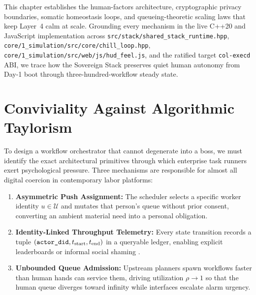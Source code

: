 This chapter establishes the human-factors architecture, cryptographic privacy boundaries, somatic homeostasis loops, and queueing-theoretic scaling laws that keep Layer~4 calm at scale. Grounding every mechanism in the live C++20 and JavaScript implementation across \texttt{src/stack/shared\_stack\_runtime.hpp}, \texttt{core/1\_simulation/src/core/chill\_loop.hpp}, \texttt{core/1\_simulation/src/web/js/hud\_feel.js}, and the ratified target \texttt{col-execd} ABI, we trace how the Sovereign Stack preserves quiet human autonomy from Day-1 boot through three-hundred-workflow steady state.

\section{Conviviality Against Algorithmic Taylorism}
\label{sec:conviviality-vs-taylorism}

To design a workflow orchestrator that cannot degenerate into a boss, we must identify the exact architectural primitives through which enterprise task runners exert psychological pressure. Three mechanisms are responsible for almost all digital coercion in contemporary labor platforms:
\begin{enumerate}
  \item \textbf{Asymmetric Push Assignment:} The scheduler selects a specific worker identity $u \in \mathcal{U}$ and mutates that person's queue without prior consent, converting an ambient material need into a personal obligation.
  \item \textbf{Identity-Linked Throughput Telemetry:} Every state transition records a tuple $(\text{\texttt{actor\_did}}, t_{\text{start}}, t_{\text{end}})$ in a queryable ledger, enabling explicit leaderboards or informal social shaming \parencite{freeman1972,zuboff2019}.
  \item \textbf{Unbounded Queue Admission:} Upstream planners spawn workflows faster than human hands can service them, driving utilization $\rho \to 1$ so that the human queue diverges toward infinity while interfaces escalate alarm urgency.
\end{enumerate}

